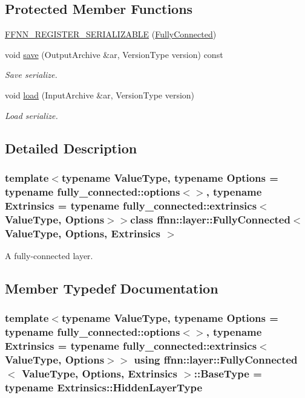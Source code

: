\subsection*{Protected Member Functions}
\begin{DoxyCompactItemize}
\item 
\hyperlink{classffnn_1_1layer_1_1_fully_connected_ad66275e42a79a3f10b34828b98d964ab}{F\-F\-N\-N\-\_\-\-R\-E\-G\-I\-S\-T\-E\-R\-\_\-\-S\-E\-R\-I\-A\-L\-I\-Z\-A\-B\-L\-E} (\hyperlink{classffnn_1_1layer_1_1_fully_connected}{Fully\-Connected})
\item 
void \hyperlink{classffnn_1_1layer_1_1_fully_connected_a471dc3b71aa344ca93274bcda02fe875}{save} (Output\-Archive \&ar, Version\-Type version) const 
\begin{DoxyCompactList}\small\item\em Save serialize. \end{DoxyCompactList}\item 
void \hyperlink{classffnn_1_1layer_1_1_fully_connected_aaf538f819eff90612aaf815007d77890}{load} (Input\-Archive \&ar, Version\-Type version)
\begin{DoxyCompactList}\small\item\em Load serialize. \end{DoxyCompactList}\end{DoxyCompactItemize}


\subsection{Detailed Description}
\subsubsection*{template$<$typename Value\-Type, typename Options = typename fully\-\_\-connected\-::options$<$$>$, typename Extrinsics = typename fully\-\_\-connected\-::extrinsics$<$\-Value\-Type, Options$>$$>$class ffnn\-::layer\-::\-Fully\-Connected$<$ Value\-Type, Options, Extrinsics $>$}

A fully-\/connected layer. 

\subsection{Member Typedef Documentation}
\hypertarget{classffnn_1_1layer_1_1_fully_connected_afd4e92710e0f74a32ea0ca1a44925b48}{
\subsubsection[{Base\-Type}]{\setlength{\rightskip}{0pt plus 5cm}template$<$typename Value\-Type, typename Options = typename fully\-\_\-connected\-::options$<$$>$, typename Extrinsics = typename fully\-\_\-connected\-::extrinsics$<$\-Value\-Type, Options$>$$>$ using {\bf ffnn\-::layer\-::\-Fully\-Connected}$<$ Value\-Type, Options, Extrinsics $>$\-::{\bf Base\-Type} =  typename Extrinsics\-::\-Hidden\-Layer\-Type}}\label{classffnn_1_1layer_1_1_fully_connected_afd4e92710e0f74a32ea0ca1a44925b48}


